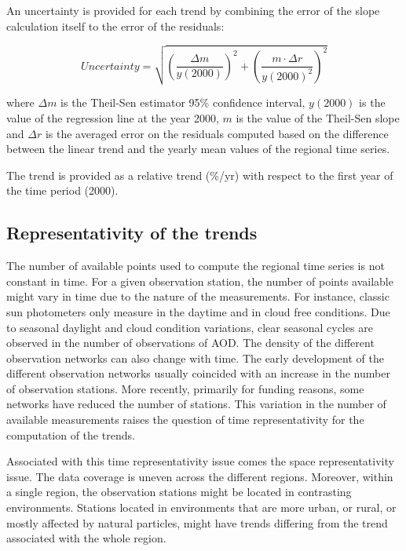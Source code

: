 \documentclass[acp, manuscript]{copernicus}
\begin{document}
An uncertainty is provided for each trend by combining the error of the slope calculation itself to the error of the residuals:

\begin{equation}
 Uncertainty = \sqrt{{\left (\frac{\Delta m}{y(2000)}\right )}^{2} + {\left ( \frac{m \cdot \Delta r}{y(2000)^2}\right )}^{2} }
\end{equation}

where $\Delta m$ is the Theil-Sen estimator 95\% confidence interval, $y(2000)$ is the value of the regression line at the year 2000, $m$ is the value of the Theil-Sen slope and $\Delta r$ is the averaged error on the residuals computed based on the difference between the linear trend and the yearly mean values of the regional time series.

The trend is provided as a relative trend (\%/yr) with respect to the first year of the time period (2000).

\subsection{Representativity of the trends}
The number of available points used to compute the regional time series is not constant in time. For a given observation station, the number of points available might vary in time due to the nature of the measurements. For instance, classic sun photometers only measure in the daytime and in cloud free conditions. Due to seasonal daylight and cloud condition variations, clear seasonal cycles are observed in the number of observations of AOD. The density of the different observation networks can also change with time. The early development of the different observation networks usually coincided with an increase in the number of observation stations. More recently, primarily for funding reasons, some networks have reduced the number of stations. This variation in the number of available measurements raises the question of time representativity for the computation of the trends.

Associated with this time representativity issue comes the space representativity issue. The data coverage is uneven across the different regions. Moreover, within a single region, the observation stations might be located in contrasting environments. Stations located in environments that are more urban, or rural, or mostly affected by natural particles, might have trends differing from the trend associated with the whole region.
\end{document}
